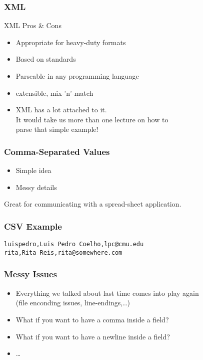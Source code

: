 \begin{frame}[fragile]
\frametitle{XML}

\begin{block}{XML Pros \& Cons}
\begin{itemize}
\item Appropriate for \alert{heavy-duty} formats
\item Based on standards
\item Parseable in any programming language
\item extensible, mix-'n'-match
\item XML has a lot attached to it.\\
    It would take us more than one lecture on how to\\
    parse that simple example!
\end{itemize}
\end{block}

\end{frame}

\begin{frame}[fragile]
\frametitle{Comma-Separated Values}
\begin{itemize}
\item Simple idea
\item Messy details
\end{itemize}

Great for communicating with a spread-sheet application.
\end{frame}

\begin{frame}[fragile]
\frametitle{CSV Example}

\begin{verbatim}
luispedro,Luis Pedro Coelho,lpc@cmu.edu
rita,Rita Reis,rita@somewhere.com
\end{verbatim}
\end{frame}

\begin{frame}[fragile]
\frametitle{Messy Issues}
\begin{itemize}
\item Everything we talked about last time comes into play again\\
    (file enconding issues, line-endings,\ldots)
\item What if you want to have a comma inside a field?
\item What if you want to have a newline inside a field?
\item \ldots
\end{itemize}
\end{frame}

